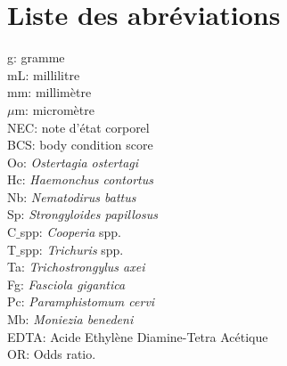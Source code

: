 \chapter*{Liste des abréviations}


{\setlength{\parindent}{0pt} g: gramme} \\
mL: millilitre \\
mm: millimètre \\
$\mu$m: micromètre \\
NEC: note d'état corporel \\
BCS: body condition score \\
Oo: \textit{Ostertagia ostertagi} \\
Hc: \textit{Haemonchus contortus} \\
Nb: \textit{Nematodirus battus} \\
Sp: \textit{Strongyloides papillosus} \\
C$\_$spp: \textit{Cooperia} spp. \\
T$\_$spp: \textit{Trichuris} spp. \\
Ta: \textit{Trichostrongylus axei} \\
Fg: \textit{Fasciola gigantica} \\
Pc: \textit{Paramphistomum cervi} \\
Mb: \textit{Moniezia benedeni} \\
EDTA: Acide Ethylène Diamine-Tetra Acétique\\
OR: Odds ratio. \\

